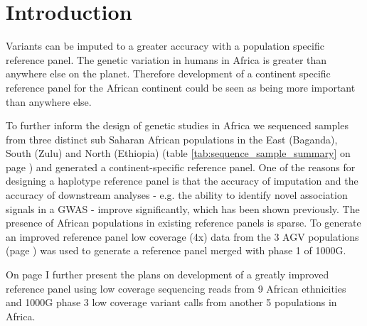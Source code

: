 \section{Introduction}
\label{sec:rp_introduction}

Variants can be imputed to a greater accuracy with a population specific reference panel.\cite{Jallow2009} The genetic variation in humans in Africa is greater than anywhere else on the planet.\cite{Gurdasani2015} Therefore development of a continent specific reference panel for the African continent could be seen as being more important than anywhere else.

To further inform the design of genetic studies in Africa we sequenced samples from three distinct sub Saharan African populations in the East (Baganda), South (Zulu) and North (Ethiopia) (table \ref{tab:sequence_sample_summary} on page \pageref{tab:sequence_sample_summary}) and generated a continent-specific reference panel. One of the reasons for designing a haplotype reference panel is that the accuracy of imputation and the accuracy of downstream analyses - e.g. the ability to identify novel association signals in a \gls{GWAS} - improve significantly, which has been shown previously.\cite{Jallow2009}\cite{Gurdasani2015} The presence of African populations in existing reference panels is sparse. To generate an improved reference panel low coverage (4x) data from the 3 \gls{AGV} populations (page \pageref{sec:agv_data_description}) was used to generate a reference panel merged with phase 1 of \gls{1000G}.\cite{1000G2012}

On page \pageref{sec:adrp} I further present the plans on development of a greatly improved reference panel using low coverage sequencing reads from 9 African ethnicities and \gls{1000G} phase 3\cite{1000G2015} low coverage variant calls from another 5 populations in Africa.
